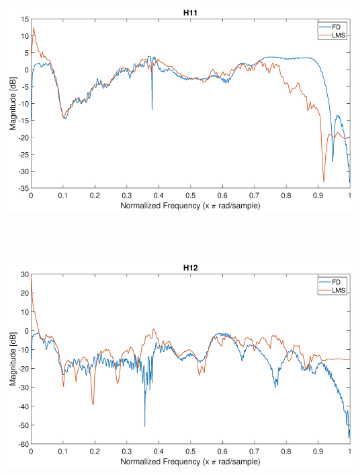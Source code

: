 \documentclass[12pt,a4paper,titlepage]{article}
\begin{document}
\begin{figure}[h]
	\centering
	\begin{subfigure}{1\textwidth}
		\includegraphics[width=1\textwidth]{Immagini/H11_FD_LMS}
		\caption{}
		\label{fig:Confronto_H11_LMS_FD}
	\end{subfigure}\\
	\begin{subfigure}{1\textwidth}
		\includegraphics[width=1\textwidth]{Immagini/H12_FD_LMS}
		\caption{}
		\label{fig:Confronto_H12_LMS_FD}
	\end{subfigure}
\end{figure}
\end{document}
